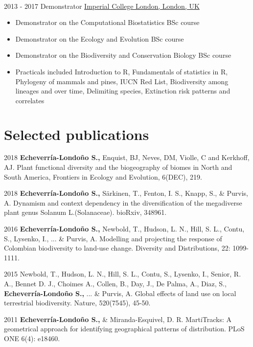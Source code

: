 \documentclass[icon]{twentysecondcv} %
\begin{document}
\begin{twenty}
{	}
    \\   
	\twentyitem
	{2013 - }
	{2017}
	{Demonstrator}
	{\href{https://www.imperial.ac.uk/}{Imperial College London, London, UK}}
	{}
	{
	 {\begin{itemize}
		\item Demonstrator on the Computational Biostatistics BSc course
		\item Demonstrator on the Ecology and Evolution BSc course
		\item Demonstrator on the Biodiversity and Conservation Biology BSc course
		\item Practicals included Introduction to R, Fundamentals of statistics in R, Phylogeny of mammals and pines, IUCN Red List, Biodiversity among lineages and over time, Delimiting species, Extinction risk patterns and correlates
		
	\end{itemize}}
    	}
        
\end{twenty}


\section{Selected publications}

2018 \textbf{Echeverr\'ia-Londo\~no S.,} Enquist, BJ, Neves, DM, Violle, C and Kerkhoff, AJ.  Plant functional diversity and the biogeography of biomes in North and South America, Frontiers in Ecology and Evolution, 6(DEC), 219.

2018 \textbf{Echeverr\'ia-Londo\~no S.,}  S{\"a}rkinen, T., Fenton, I. S., Knapp, S., \& Purvis, A. Dynamism and context dependency in the diversification of the megadiverse plant genus Solanum L.(Solanaceae). bioRxiv, 348961.

2016 \textbf{Echeverr\'ia-Londo\~no S.,} Newbold, T., Hudson, L. N., Hill, S. L., Contu, S., Lysenko, I., ... \& Purvis, A. Modelling and projecting the response of Colombian biodiversity to land-use change. Diversity and Distributions, 22: 1099-1111.

2015 Newbold, T., Hudson, L. N., Hill, S. L., Contu, S., Lysenko, I., Senior, R. A., Bennet D. J., Choimes A., Collen, B., Day, J., De Palma, A., Diaz, S., \textbf{Echeverr\'ia-Londo\~no S.,} ... \& Purvis, A. Global effects of land use on local terrestrial biodiversity. Nature, 520(7545), 45-50.

2011 \textbf{Echeverr\'ia-Londo\~no S., }\& Miranda-Esquivel, D. R. MartiTracks: A geometrical approach for identifying geographical patterns of distribution. PLoS ONE 6(4): e18460.
\end{document}
